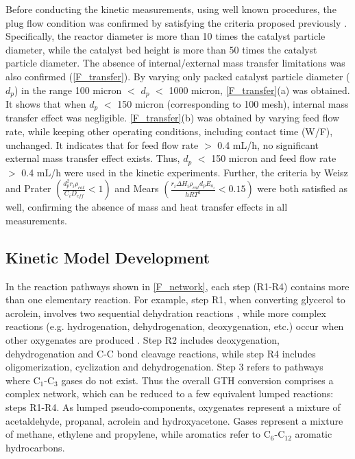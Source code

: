 \documentclass[journal=iecred,manuscript=article]{achemso}
\begin{document}
Before conducting the kinetic measurements, using well known procedures,
the plug flow condition was confirmed by satisfying the criteria proposed previously \cite{Perego1999}.
Specifically, the reactor diameter is more than 10 times the catalyst particle diameter,
while the catalyst bed height is more than 50 times the catalyst particle diameter.
The absence of internal/external mass transfer limitations was also confirmed (\ref{F_transfer}).
By varying only packed catalyst particle diameter ($d_{p}$) in the range 100 micron $<$ $d_{p}$ $<$ 1000 micron,
\ref{F_transfer}(a) was obtained.
It shows that when $d_{p}$ $<$ 150 micron (corresponding to 100 mesh), internal mass transfer effect was negligible.
\ref{F_transfer}(b) was obtained by varying feed flow rate, while keeping other operating conditions, including contact time (W/F), unchanged.
It indicates that for feed flow rate $>$ 0.4 mL/h, no significant external mass transfer effect exists.
Thus, $d_{p}$ $<$ 150 micron and feed flow rate $>$ 0.4 mL/h were used in the kinetic experiments.
Further, the criteria by Weisz and Prater \cite{Weisz1954}
$\left(\frac{d^2_pr_i\rho_{cat}}{C_iD_{eff}}  < 1\right)$
and Mears \cite{Mears1971}
$\left(\frac{r_i \Delta H_i \rho_{cat} d_p E_{a_{i}} }{h R T^2} < 0.15\right)$
were both satisfied as well, confirming the absence of mass and heat transfer effects in all measurements.

\subsection{Kinetic Model Development}

In the reaction pathways shown in \ref{F_network}, each step (R1-R4) contains more than one elementary reaction.
For example, step R1, when converting glycerol to acrolein,
involves two sequential dehydration reactions \cite{Gu2012, Zhang2015, Galadima2016b},
while more complex reactions (e.g. hydrogenation, dehydrogenation, deoxygenation, etc.)
occur when other oxygenates are produced \cite{Park2015, Tamiyakul2015, Wang2016}.
Step R2 includes deoxygenation, dehydrogenation and C-C bond cleavage reactions,
while step R4 includes oligomerization, cyclization and dehydrogenation.
Step 3 refers to pathways where C$_1$-C$_3$ gases do not exist.
Thus the overall GTH conversion comprises a complex network,
which can be reduced to a few equivalent lumped reactions: steps R1-R4.
As lumped pseudo-components, oxygenates represent a mixture of acetaldehyde, propanal, acrolein and hydroxyacetone.
Gases represent a mixture of methane, ethylene and propylene, while aromatics refer to C$_6$-C$_{12}$ aromatic hydrocarbons.
\end{document}
